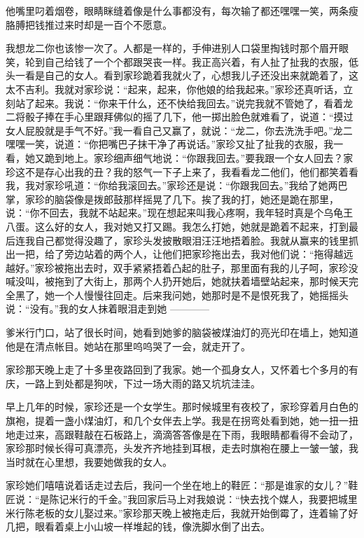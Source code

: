 \documentclass[12pt,UTF8]{ctexbook}
\begin{document}
他嘴里叼着烟卷，眼睛眯缝着像是什么事都没有，每次输了都还嘿嘿一笑，两条瘦胳膊把钱推过来时却是一百个不愿意。

我想龙二你也该惨一次了。人都是一样的，手伸进别人口袋里掏钱时那个眉开眼笑，轮到自己给钱了一个个都跟哭丧一样。我正高兴着，有人扯了扯我的衣服，低头一看是自己的女人。看到家珍跪着我就火了，心想我儿子还没出来就跪着了，这太不吉利。我就对家珍说：“起来，起来，你他娘的给我起来。”家珍还真听话，立刻站了起来。我说：“你来干什么，还不快给我回去。”说完我就不管她了，看着龙二将骰子捧在手心里跟拜佛似的摇了几下，他一掷出脸色就难看了，说道：“摸过女人屁股就是手气不好。”我一看自己又赢了，就说：“龙二，你去洗洗手吧。”龙二嘿嘿一笑，说道：“你把嘴巴子抹干净了再说话。”家珍又扯了扯我的衣服，我一看，她又跪到地上。家珍细声细气地说：“你跟我回去。”要我跟一个女人回去？家珍这不是存心出我的丑？我的怒气一下子上来了，我看看龙二他们，他们都笑着看我，我对家珍吼道：“你给我滚回去。”家珍还是说：“你跟我回去。”我给了她两巴掌，家珍的脑袋像是拨郎鼓那样摇晃了几下。挨了我的打，她还是跪在那里，说：“你不回去，我就不站起来。”现在想起来叫我心疼啊，我年轻时真是个乌龟王八蛋。这么好的女人，我对她又打又踢。我怎么打她，她就是跪着不起来，打到最后连我自己都觉得没趣了，家珍头发披散眼泪汪汪地捂着脸。我就从赢来的钱里抓出一把，给了旁边站着的两个人，让他们把家珍拖出去，我对他们说：“拖得越远越好。”家珍被拖出去时，双手紧紧捂着凸起的肚子，那里面有我的儿子呵，家珍没喊没叫，被拖到了大街上，那两个人扔开她后，她就扶着墙壁站起来，那时候天完全黑了，她一个人慢慢往回走。后来我问她，她那时是不是恨死我了，她摇摇头说：“没有。”我的女人抹着眼泪走到她
------------

爹米行门口，站了很长时间，她看到她爹的脑袋被煤油灯的亮光印在墙上，她知道他是在清点帐目。她站在那里呜呜哭了一会，就走开了。

家珍那天晚上走了十多里夜路回到了我家。她一个孤身女人，又怀着七个多月的有庆，一路上到处都是狗吠，下过一场大雨的路又坑坑洼洼。

早上几年的时候，家珍还是一个女学生。那时候城里有夜校了，家珍穿着月白色的旗袍，提着一盏小煤油灯，和几个女伴去上学。我是在拐弯处看到她，她一扭一扭地走过来，高跟鞋敲在石板路上，滴滴答答像是在下雨，我眼睛都看得不会动了，家珍那时候长得可真漂亮，头发齐齐地挂到耳根，走去时旗袍在腰上一皱一皱，我当时就在心里想，我要她做我的女人。

家珍她们嘻嘻说着话走过去后，我问一个坐在地上的鞋匠：“那是谁家的女儿？”鞋匠说：“是陈记米行的千金。”我回家后马上对我娘说：“快去找个媒人，我要把城里米行陈老板的女儿娶过来。”家珍那天晚上被拖走后，我就开始倒霉了，连着输了好几把，眼看着桌上小山坡一样堆起的钱，像洗脚水倒了出去。
\end{document}
